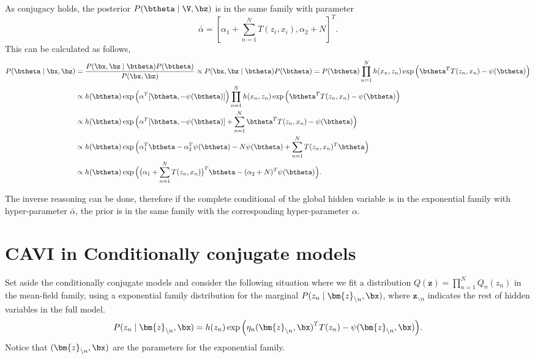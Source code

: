 As conjugacy holds, the posterior \(P(\btheta \mid \V, \bz)\) is in the same family with parameter
\[
  \bar{\alpha} = [\alpha_{1} + \sum_{n=1}^{N} T(z_{i}, x_{i}), \alpha_{2}+ N]^{T}.
\]
This can be calculated as follows,
\[
  \begin{aligned}
    P(\btheta \mid \bx, \bz) &= \frac{P(\bx, \bz \mid \btheta) P(\btheta)}{P(\bx, \bz)} \propto  P(\bx, \bz \mid \btheta) P(\btheta) = P(\btheta) \prod_{n=1}^{N}h(x_{n}, z_{n})\exp \Big( \btheta^{T}T(z_{n}, x_{n})  - \psi(\btheta) \Big)\\
    &\propto  h(\btheta) \exp \Big( \alpha^{T}[\btheta, -\psi(\btheta)]\Big)  \prod_{n=1}^{N}h(x_{n}, z_{n})\exp \Big( \btheta^{T}T(z_{n}, x_{n})  - \psi(\btheta) \Big)\\
    &\propto h(\btheta) \exp \Big(   \alpha^{T}[\btheta, -\psi(\btheta)] + \sum_{n=1}^{N}  \btheta^{T}T(z_{n}, x_{n})  - \psi(\btheta)  \Big)\\
    &\propto h(\btheta) \exp \Big(   \alpha_{1}^{T}\btheta  - \alpha_{2}^{T}\psi(\btheta) - N\psi(\btheta) + \sum_{n=1}^{N}  T(z_{n}, x_{n})^{T}\btheta  \Big)\\
    &\propto h(\btheta) \exp \Big(   \big(\alpha_{1} + \sum_{n=1}^{N}  T(z_{n}, x_{n})\big)^{T} \btheta  - (\alpha_{2} + N)^{T}\psi(\btheta) \Big).
  \end{aligned}
\]

The inverse reasoning can be done, therefore if the complete conditional of the global hidden variable is in the exponential family with hyper-parameter \(\bar{\alpha}\), the prior is in the same family with the corresponding hyper-parameter \(\alpha\).

\section{CAVI in Conditionally conjugate models} \label{sec:cavi_ccm}

Set aside the conditionally conjugate models and consider the following situation where we fit a distribution \(Q(\bm{z}) = \prod_{n=1}^{N} Q_{n}(z_{n})\) in the mean-field family, using a exponential family distribution for the marginal \(P(z_{n} \mid \bm{z}_{\backslash n}, \bx)\), where \(\bm{z}_{\backslash n}\) indicates the rest of hidden variables in the full model.
\[
  P(z_{n} \mid \bm{z}_{\backslash n}, \bx) = h(z_{n})\exp \Big( {\eta_{n}(\bm{z}_{\backslash n}, \bx)}^{T}T(z_{n}) - \psi(\bm{z}_{\backslash n}, \bx) \Big).
\]
Notice that \( (\bm{z}_{\backslash n}, \bx) \) are the parameters for the exponential family.


